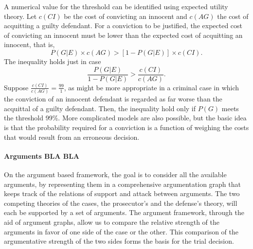 \documentclass[10pt]{article}
\begin{document}
%
A numerical value for the threshold can be identified using expected utility theory. 
Let $c(CI)$ be the cost of convicting an innocent and $c(AG)$ the cost 
of acquitting a guilty defendant. For a conviction to be justified, the 
expected cost of convicting an innocent must be lower than the expected 
cost of acquitting an innocent, that is, 
%
\[ P(G|E) \times c(AG) >  [1-P(G|E)] \times c(CI) .\]
%
The inequality holds just in case 
%
\[ \frac{P(G|E)}{1- P(G|E)} > \frac{c(CI)}{c(AG)}.\]
%
Suppose $ \frac{c(CI)}{c(AG)}=\frac{99}{1}$, as might be more appropriate in a criminal 
case in which the conviction of an innocent defendant is regarded as far worse than the acquittal of a guilty defendant.
Then, the inequality hold only if $P(G)$ meets the threshold 99\%.
More complicated models are also possible, but the basic idea is that the probability 
required for a conviction is a function of weighing the 
costs that would result from an erroneous decision. 



\paragraph{Arguments BLA BLA}

On the argument based 
framework, the goal is to consider all the available arguments, by representing them in a comprehensive argumentation graph that 
keeps track of the relations of support and attack between arguments. The two competing theories of the cases, the prosecutor's and the defense's theory, will each
be supported by a set of arguments. The argument framework, through the aid of argument graphs, allow us to 
compare the relative strength of the arguments in favor of 
one side of the case or the other. This comparison of the argumentative strength of the two sides 
forms the basis for the trial decision.
\end{document}
